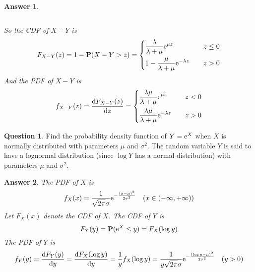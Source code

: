 \documentclass[utf8]{article}
\theoremstyle{definition}%
\newtheorem{question}{Question} %
\theoremstyle{plain}%
\newtheorem{answer}{Answer} %
\begin{document}
\begin{answer}
\begin{enumerate}[label=(\alph*)]
\begin{equation}
            \end{equation}
    \end{enumerate}
    So the CDF of $X - Y$ is
    \begin{equation}
        F_{X - Y}(z) = 1 - \mathbf{P}(X - Y > z) = \left\{\begin{aligned}
            &\frac{\lambda}{\lambda + \mu} \mathrm{e}^{\mu z} \quad &z \leq 0 \\
            &1 - \frac{\mu}{\lambda + \mu} \mathrm{e}^{-\lambda z} \quad &z > 0
        \end{aligned}\right.
    \end{equation}
    And the PDF of $X - Y$ is
    \begin{equation}
        f_{X - Y}(z) = \dv{F_{X - Y}(z)}{z} = \left\{\begin{aligned}
            &\frac{\lambda\mu}{\lambda + \mu} \mathrm{e}^{\mu z} \quad &z < 0 \\
            &\frac{\lambda\mu}{\lambda + \mu} \mathrm{e}^{-\lambda z} \quad &z > 0
        \end{aligned}\right.
    \end{equation}
\end{answer}

\begin{question}
    Find the probability density function of $Y = \mathrm{e}^X$ when $X$ is normally distributed with parameters $\mu$ and $\sigma^2$. The random variable $Y$ is said to have a lognormal distribution (since $\log Y$ has a normal distribution) with parameters $\mu$ and $\sigma^2$.
\end{question}
\begin{answer}
    The PDF of $X$ is
    \begin{equation}
        f_{X}(x) = \frac{1}{\sqrt{2\pi}\sigma} \mathrm{e}^{-\frac{(x - \mu)^2}{2\sigma^2}} \quad (x \in (-\infty, +\infty))
    \end{equation}
    Let $F_{X}(x)$ denote the CDF of $X$. The CDF of $Y$ is
    \begin{equation}
        F_{Y}(y) = \mathbf{P}(\mathrm{e}^X \leq y) = F_{X}(\log y)
    \end{equation}
    The PDF of $Y$ is
    \begin{equation}
        f_{Y}(y) = \dv{F_{Y}(y)}{y} = \dv{F_{X}(\log y)}{y} = \frac{1}{y} f_{X}(\log y) = \frac{1}{y\sqrt{2\pi}\sigma} \mathrm{e}^{-\frac{(\log y - \mu)^2}{2\sigma^2}} \quad (y > 0)
    \end{equation}
\end{answer}
\end{document}

